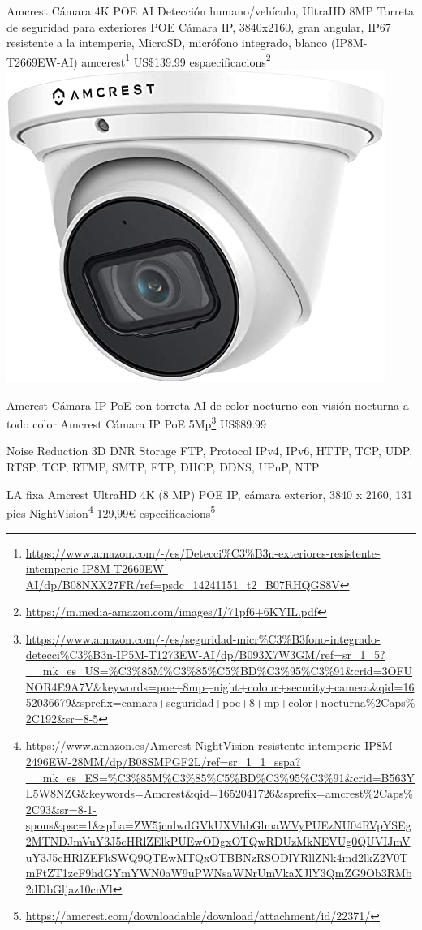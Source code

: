 \documentclass[
  10pt,
]{krantz}
\DeclareRobustCommand{\href}[2]{#2\footnote{\url{#1}}}
\begin{document}
Amcrest Cámara 4K POE AI Detección humano/vehículo, UltraHD 8MP Torreta de seguridad para exteriores POE Cámara IP, 3840x2160, gran angular, IP67 resistente a la intemperie, MicroSD, micrófono integrado, blanco (IP8M-T2669EW-AI) \href{https://www.amazon.com/-/es/Detecci\%C3\%B3n-exteriores-resistente-intemperie-IP8M-T2669EW-AI/dp/B08NXX27FR/ref=psdc_14241151_t2_B07RHQGS8V}{amcerest} US\$139.99 \href{https://m.media-amazon.com/images/I/71pf6+6KYIL.pdf}{espaecificacions} \includegraphics{imatges/amcrest.jpg}

Amcrest Cámara IP PoE con torreta AI de color nocturno con visión nocturna a todo color \href{https://www.amazon.com/-/es/seguridad-micr\%C3\%B3fono-integrado-detecci\%C3\%B3n-IP5M-T1273EW-AI/dp/B093X7W3GM/ref=sr_1_5?__mk_es_US=\%C3\%85M\%C3\%85\%C5\%BD\%C3\%95\%C3\%91\&crid=3OFUNOR4E9A7V\&keywords=poe+8mp+night+colour+security+camera\&qid=1652036679\&sprefix=camara+seguridad+poe+8+mp+color+nocturna\%2Caps\%2C192\&sr=8-5}{Amcrest Cámara IP PoE 5Mp} US\$89.99

Noise Reduction 3D DNR Storage FTP, Protocol IPv4, IPv6, HTTP, TCP, UDP, RTSP, TCP, RTMP, SMTP, FTP, DHCP, DDNS, UPnP, NTP

LA fixa \href{https://www.amazon.es/Amcrest-NightVision-resistente-intemperie-IP8M-2496EW-28MM/dp/B08SMPGF2L/ref=sr_1_1_sspa?__mk_es_ES=\%C3\%85M\%C3\%85\%C5\%BD\%C3\%95\%C3\%91\&crid=B563YL5W8NZG\&keywords=Amcrest\&qid=1652041726\&sprefix=amcrest\%2Caps\%2C93\&sr=8-1-spons\&psc=1\&spLa=ZW5jcnlwdGVkUXVhbGlmaWVyPUEzNU04RVpYSEg2MTNDJmVuY3J5cHRlZElkPUEwODgxOTQwRDUzMkNEVUg0QUVIJmVuY3J5cHRlZEFkSWQ9QTEwMTQxOTBBNzRSODlYRllZNk4md2lkZ2V0TmFtZT1zcF9hdGYmYWN0aW9uPWNsaWNrUmVkaXJlY3QmZG9Ob3RMb2dDbGljaz10cnVl}{Amcrest UltraHD 4K (8 MP) POE IP, cámara exterior, 3840 x 2160, 131 pies NightVision} 129,99€ \href{https://amcrest.com/downloadable/download/attachment/id/22371/}{especificacions}
\end{document}
